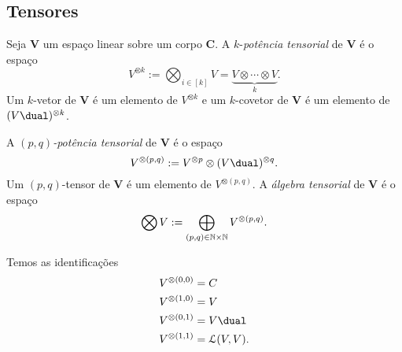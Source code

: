 



\subsection{Tensores}

\begin{defi}
Seja $\bm V$ um espaço linear sobre um corpo $\bm C$. A $k$-\emph{potência tensorial} de $\bm V$ é o espaço
	\begin{equation*}
	V^{\otimes k} := \bigotimes_{i \in [k]} V = \underbrace{V \otimes \cdots \otimes V}_{k}.
	\end{equation*}
Um $k$-vetor de $\bm V$ é um elemento de $V^{\otimes k}$ e um $k$-covetor de $\bm V$ é um elemento de $(V\dual)^{\otimes k}$.

A \emph{$(p,q)$-potência tensorial} de $\bm V$ é o espaço
	\begin{equation*}
	V^{\otimes (p,q)} := V^{\otimes p} \otimes (V\dual)^{\otimes q}.
	\end{equation*}
Um $(p,q)$-tensor de $\bm V$ é um elemento de $V^{\otimes (p,q)}$. A \emph{álgebra tensorial} de $\bm V$ é o espaço
	\begin{equation*}
	\bigotimes V := \bigoplus_{(p,q) \in \mathbb{N} \times \mathbb{N}} V^{\otimes (p,q)}.
	\end{equation*}
\end{defi}

Temos as identificações
	\begin{align*}
	V^{\otimes (0,0)} &= C \\
	V^{\otimes (1,0)} &= V \\
	V^{\otimes (0,1)} &= V\dual \\
	V^{\otimes (1,1)} &= \lin(V,V). \\
	\end{align*}












